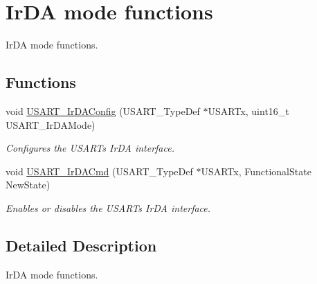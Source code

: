 \hypertarget{group___u_s_a_r_t___group7}{}\section{Ir\+DA mode functions}
\label{group___u_s_a_r_t___group7}


Ir\+DA mode functions.  


\subsection*{Functions}
\begin{DoxyCompactItemize}
\item 
void \mbox{\hyperlink{group___u_s_a_r_t___group7_ga81a0cd36199040bf6d266b57babd678e}{U\+S\+A\+R\+T\+\_\+\+Ir\+D\+A\+Config}} (U\+S\+A\+R\+T\+\_\+\+Type\+Def $\ast$U\+S\+A\+R\+Tx, uint16\+\_\+t U\+S\+A\+R\+T\+\_\+\+Ir\+D\+A\+Mode)
\begin{DoxyCompactList}\small\item\em Configures the U\+S\+A\+RT\textquotesingle{}s Ir\+DA interface. \end{DoxyCompactList}\item 
void \mbox{\hyperlink{group___u_s_a_r_t___group7_gabff56ebb494fdfadcc6ef4fe9ac8dd24}{U\+S\+A\+R\+T\+\_\+\+Ir\+D\+A\+Cmd}} (U\+S\+A\+R\+T\+\_\+\+Type\+Def $\ast$U\+S\+A\+R\+Tx, Functional\+State New\+State)
\begin{DoxyCompactList}\small\item\em Enables or disables the U\+S\+A\+RT\textquotesingle{}s Ir\+DA interface. \end{DoxyCompactList}\end{DoxyCompactItemize}


\subsection{Detailed Description}
Ir\+DA mode functions. 

